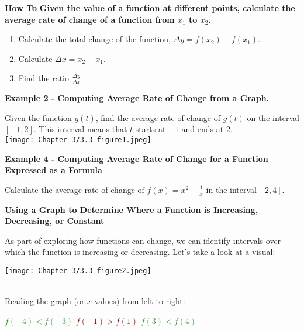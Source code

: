 \documentclass[12pt]{book}
\newcommand{\D}{\displaystyle}
\begin{document}
\begin{boxR}
    \textbf{How To}
    \vspace{1mm}
    \hline
    \vspace{2mm}
   \textbf{ Given the value of a function at different points, calculate the average rate of change of a function from $x_1$ to $x_2$.}
   \begin{enumerate}
       \item Calculate the total change of the function, $\Delta y = f(x_2)-f(x_1)$.
       \item Calculate $\Delta x = x_2-x_1$.
       \item Find the ratio $\frac{\Delta y}{\Delta x}$.
   \end{enumerate}
\end{boxR}

\underline{\textbf{Example 2 - Computing Average Rate of Change from a Graph.}}

Given the function $g(t)$, find the average rate of change of $g(t)$ on the interval $[-1, 2]$. This interval means that $t$ starts at $-1$ and ends at $2$.
\\

\texttt{[image: Chapter 3/3.3-figure1.jpeg]}

\newpage


\underline{\textbf{Example 4 - Computing Average Rate of Change for a Function Expressed as a Formula}}
\vspace{1mm}

Calculate the average rate of change of $\D f(x)=x^2 - \frac{1}{x}$ in the interval $[2,4]$.

\vspace{80mm}

{\large \textbf{Using a Graph to Determine Where a Function is Increasing, Decreasing, or Constant}}
\vspace{3mm}

As part of exploring how functions can change, we can identify intervals over which the function is increasing or decreasing. Let's take a look at a visual:

\centerline{\texttt{[image: Chapter 3/3.3-figure2.jpeg]}}

\\


Reading the graph (or $x$ values) from left to right:
\\

\centerline{
\textcolor{ForestGreen}{$\D f(-4) < f(-3)$ \hspace{5mm}}
\textcolor{Maroon}{$\D f(-1) > f(1)$  \hspace{5mm}}
\textcolor{ForestGreen}{$\D f(3) < f(4)$ } }
\newpage
\end{document}
